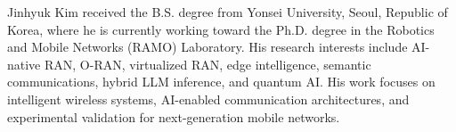 

\begin{cvparagraph}

Jinhyuk Kim received the B.S. degree from Yonsei University, Seoul, Republic of Korea, where he is currently working toward the Ph.D. degree in the Robotics and Mobile Networks (RAMO) Laboratory. His research interests include AI-native RAN, O-RAN, virtualized RAN, edge intelligence, semantic communications, hybrid LLM inference, and quantum AI. His work focuses on intelligent wireless systems, AI-enabled communication architectures, and experimental validation for next-generation mobile networks.
\end{cvparagraph}
